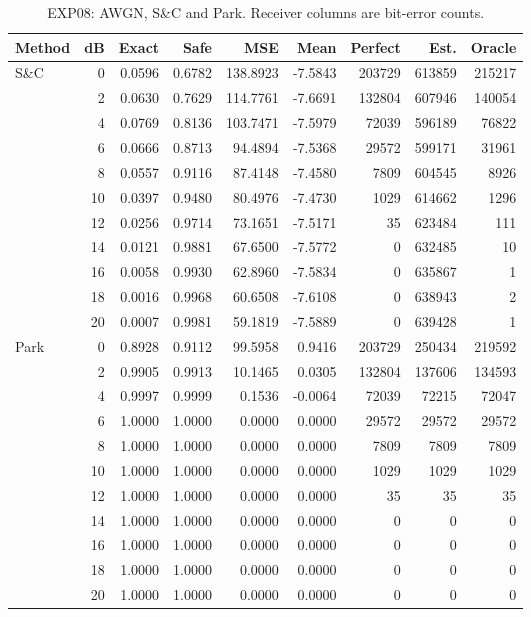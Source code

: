 \begin{table}[!p]
\centering
\caption{EXP08: AWGN, S\&C and Park. Receiver columns are bit-error counts.}
\label{app:exp08-0-0}
\small
\setlength{\tabcolsep}{3pt}
\renewcommand{\arraystretch}{1.05}
\begin{tabular}{lrrrrrrrr}
\hline
Method & dB & Exact & Safe & MSE & Mean & Perfect & Est. & Oracle \\
\hline
S\&C & 0 & 0.0596 & 0.6782 & 138.8923 & -7.5843 & 203729 & 613859 & 215217 \\
 & 2 & 0.0630 & 0.7629 & 114.7761 & -7.6691 & 132804 & 607946 & 140054 \\
 & 4 & 0.0769 & 0.8136 & 103.7471 & -7.5979 & 72039 & 596189 & 76822 \\
 & 6 & 0.0666 & 0.8713 & 94.4894 & -7.5368 & 29572 & 599171 & 31961 \\
 & 8 & 0.0557 & 0.9116 & 87.4148 & -7.4580 & 7809 & 604545 & 8926 \\
 & 10 & 0.0397 & 0.9480 & 80.4976 & -7.4730 & 1029 & 614662 & 1296 \\
 & 12 & 0.0256 & 0.9714 & 73.1651 & -7.5171 & 35 & 623484 & 111 \\
 & 14 & 0.0121 & 0.9881 & 67.6500 & -7.5772 & 0 & 632485 & 10 \\
 & 16 & 0.0058 & 0.9930 & 62.8960 & -7.5834 & 0 & 635867 & 1 \\
 & 18 & 0.0016 & 0.9968 & 60.6508 & -7.6108 & 0 & 638943 & 2 \\
 & 20 & 0.0007 & 0.9981 & 59.1819 & -7.5889 & 0 & 639428 & 1 \\
\hline
Park & 0 & 0.8928 & 0.9112 & 99.5958 & 0.9416 & 203729 & 250434 & 219592 \\
 & 2 & 0.9905 & 0.9913 & 10.1465 & 0.0305 & 132804 & 137606 & 134593 \\
 & 4 & 0.9997 & 0.9999 & 0.1536 & -0.0064 & 72039 & 72215 & 72047 \\
 & 6 & 1.0000 & 1.0000 & 0.0000 & 0.0000 & 29572 & 29572 & 29572 \\
 & 8 & 1.0000 & 1.0000 & 0.0000 & 0.0000 & 7809 & 7809 & 7809 \\
 & 10 & 1.0000 & 1.0000 & 0.0000 & 0.0000 & 1029 & 1029 & 1029 \\
 & 12 & 1.0000 & 1.0000 & 0.0000 & 0.0000 & 35 & 35 & 35 \\
 & 14 & 1.0000 & 1.0000 & 0.0000 & 0.0000 & 0 & 0 & 0 \\
 & 16 & 1.0000 & 1.0000 & 0.0000 & 0.0000 & 0 & 0 & 0 \\
 & 18 & 1.0000 & 1.0000 & 0.0000 & 0.0000 & 0 & 0 & 0 \\
 & 20 & 1.0000 & 1.0000 & 0.0000 & 0.0000 & 0 & 0 & 0 \\
\hline
\end{tabular}
\end{table}

